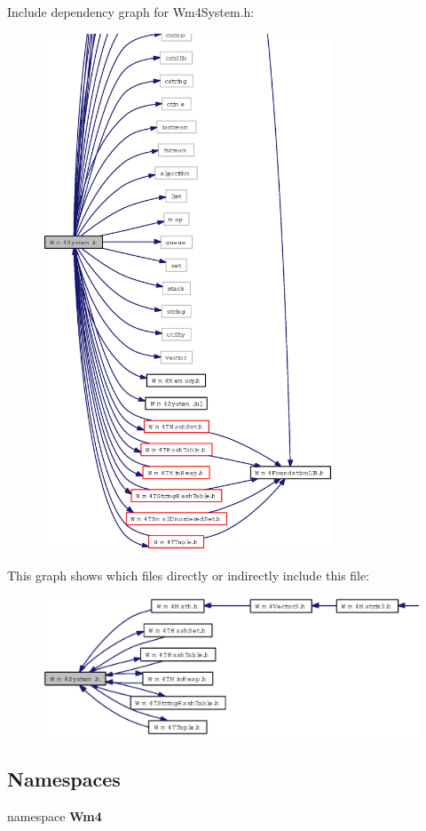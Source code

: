 Include dependency graph for Wm4System.h:\begin{figure}[H]
\begin{center}
\leavevmode
\includegraphics[width=245pt]{Wm4System_8h__incl}
\end{center}
\end{figure}


This graph shows which files directly or indirectly include this file:\begin{figure}[H]
\begin{center}
\leavevmode
\includegraphics[width=357pt]{Wm4System_8h__dep__incl}
\end{center}
\end{figure}
\subsection*{Namespaces}
\begin{CompactItemize}
\item 
namespace {\bf Wm4}
\end{CompactItemize}
